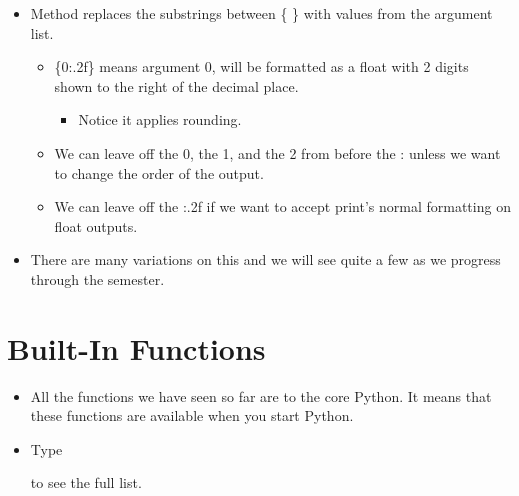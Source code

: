 \documentclass[letterpaper,10pt,english]{sphinxmanual}
\begin{document}
\begin{itemize}
\item {} 
Method  replaces the substrings between \{ \} with
values from the argument list.
\begin{itemize}
\item {} 
\{0:.2f\} means argument 0, will be formatted as a float with 2
digits shown to the right of the decimal place.
\begin{itemize}
\item {} 
Notice it applies rounding.

\end{itemize}

\item {} 
We can leave off the 0, the 1, and the 2 from before the : unless
we want to change the order of the output.

\item {} 
We can leave off the :.2f if we want to accept print’s normal
formatting on float outputs.

\end{itemize}

\item {} 
There are many variations on this and we will see quite a few as we
progress through the semester.

\end{itemize}


\section{Built-In Functions}
\label{\detokenize{lecture_notes/lec04_modules_functions1:built-in-functions}}\begin{itemize}
\item {} 
All the functions we have seen so far are  to the core
Python. It means that these functions are available when you start
Python.

\item {} 
Type

%
\begin{sphinxVerbatim}[commandchars=\\\{\}]
\end{sphinxVerbatim}

to see the full list.

\end{itemize}
\end{document}
